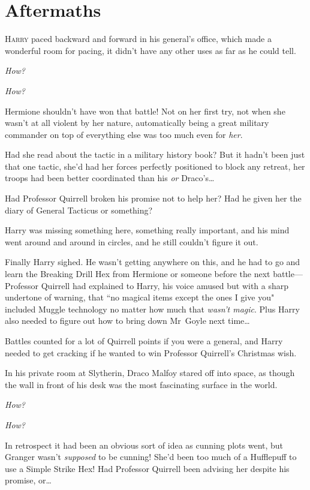 
\section{Aftermaths}

\lettrine{H}{arry} paced backward and forward in his general's office, which made a wonderful room for pacing, it didn't have any other uses as far as he could tell.

\emph{How?}

\emph{How?}

Hermione shouldn't have won that battle! Not on her first try, not when she wasn't at all violent by her nature, automatically being a great military commander on top of everything else was too much even for \emph{her}.

Had she read about the tactic in a military history book? But it hadn't been just that one tactic, she'd had her forces perfectly positioned to block any retreat, her troops had been better coordinated than his \emph{or} Draco's…

Had Professor Quirrell broken his promise not to help her? Had he given her the diary of General Tacticus or something?

Harry was missing something here, something really important, and his mind went around and around in circles, and he still couldn't figure it out.

Finally Harry sighed. He wasn't getting anywhere on this, and he had to go and learn the Breaking Drill Hex from Hermione or someone before the next battle—Professor Quirrell had explained to Harry, his voice amused but with a sharp undertone of warning, that ``no magical items except the ones I give you" included Muggle technology no matter how much that \emph{wasn't magic}. Plus Harry also needed to figure out how to bring down Mr~Goyle next time…

Battles counted for a lot of Quirrell points if you were a general, and Harry needed to get cracking if he wanted to win Professor Quirrell's Christmas wish.

\later

In his private room at Slytherin, Draco Malfoy stared off into space, as though the wall in front of his desk was the most fascinating surface in the world.

\emph{How?}

\emph{How?}

In retrospect it had been an obvious sort of idea as cunning plots went, but Granger wasn't \emph{supposed} to be cunning! She'd been too much of a Hufflepuff to use a Simple Strike Hex! Had Professor Quirrell been advising her despite his promise, or…

